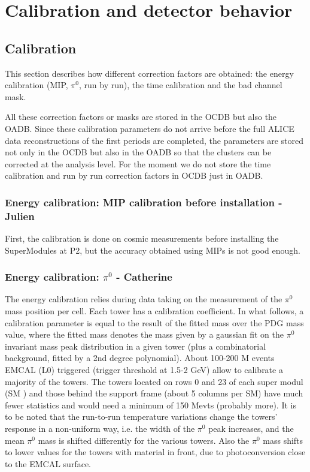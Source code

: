 
\section{Calibration and detector behavior\label{sec:strategy}}

\subsection{Calibration}

This section describes how different correction factors are obtained:  the energy calibration (MIP, $\pi^{0}$, run by run), the time calibration and the bad channel mask.\

All these correction factors or masks are stored in the OCDB but also the OADB. Since these calibration parameters do not arrive before the full ALICE data reconstructions of the first periods are completed, the parameters are stored not only in the OCDB but also in the OADB so that the clusters can be corrected at the analysis level.  For the moment we do not store the time calibration and run by run correction factors in OCDB just in OADB.

\subsubsection{Energy calibration: MIP calibration before installation - Julien}
First, the calibration is done on cosmic measurements before installing the SuperModules at P2, but the accuracy obtained using MIPs is not good enough.

\subsubsection{Energy calibration: $\pi^{0}$  - Catherine}

The energy calibration relies during data taking on the measurement of the $\pi^{0}$ mass position per cell. Each tower has a calibration coefficient. In what follows, a calibration parameter is equal to the result of the fitted mass over the PDG mass value, where the fitted mass denotes the mass given by a gaussian fit on the $\pi^{0}$ invariant mass peak distribution in a given tower (plus a combinatorial background, fitted by a 2nd degree polynomial).
About 100-200 M events EMCAL (L0) triggered (trigger threshold at 1.5-2 GeV) allow to calibrate a majority of the towers. The towers located on rows 0 and 23 of each super modul (SM ) and those behind the support frame (about 5 columns per SM) have much fewer statistics and would need a minimum of 150 Mevts (probably more). It is to be noted that the run-to-run temperature variations change the towers' response in a non-uniform way, i.e. the width of the $\pi^{0}$ peak increases, and the mean $\pi^{0}$ mass is shifted differently for the various towers. Also the $\pi^{0}$ mass shifts to lower values for the towers with material in front, due to photoconversion close to the EMCAL surface.


